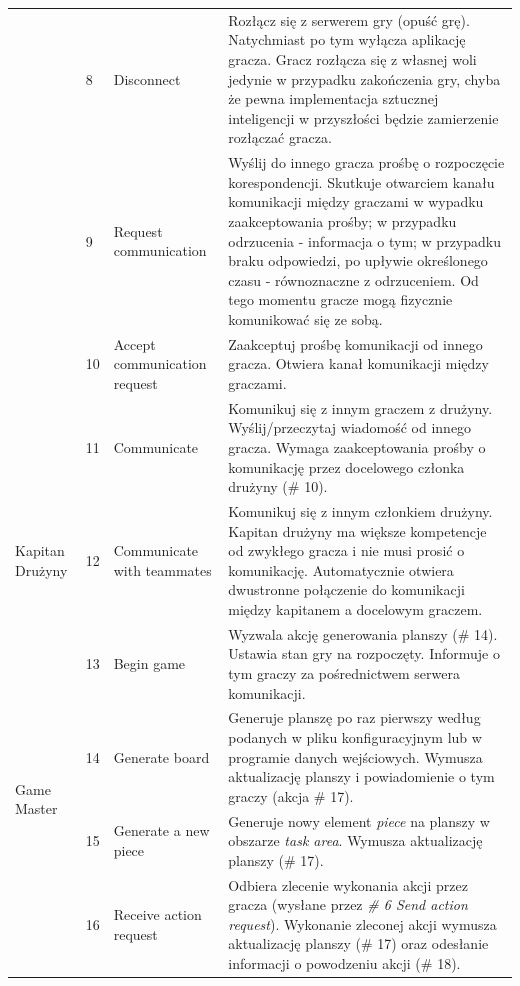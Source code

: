\documentclass[11pt]{article}
\begin{document}
\begin{longtable}{|p{}|p{}|p{}|p{}|}
\\ \cline{2-4}
& 8 
& Disconnect 
& Rozłącz się z serwerem gry (opuść grę). Natychmiast po tym wyłącza aplikację gracza. Gracz rozłącza się z własnej woli jedynie w przypadku zakończenia gry, chyba że pewna implementacja sztucznej inteligencji w przyszłości będzie zamierzenie rozłączać gracza.
\\ \cline{2-4}
& 9 
& Request communication 
& Wyślij do innego gracza prośbę o rozpoczęcie korespondencji. Skutkuje otwarciem kanału komunikacji między graczami w wypadku zaakceptowania prośby; w przypadku odrzucenia - informacja o tym; w przypadku braku odpowiedzi, po upływie określonego czasu - równoznaczne z odrzuceniem. Od tego momentu gracze mogą fizycznie komunikować się ze sobą.
\\ \cline{2-4}
& 10 
& Accept communication request 
& Zaakceptuj prośbę komunikacji od innego gracza. Otwiera kanał komunikacji między graczami.
\\ \cline{2-4}
& 11 
& Communicate 
& Komunikuj się z innym graczem z drużyny. Wyślij/przeczytaj wiadomość od innego gracza. Wymaga zaakceptowania prośby o komunikację przez docelowego członka drużyny (\# 10).
\\ \hline
Kapitan Drużyny 
& 12 
& Communicate with teammates 
& Komunikuj się z innym członkiem drużyny. Kapitan drużyny ma większe kompetencje od zwykłego gracza i nie musi prosić o komunikację. Automatycznie otwiera dwustronne połączenie do komunikacji między kapitanem a docelowym graczem. 
\\ \hline
\multirow{6}{.20\textwidth}{Game Master}
& 13
& Begin game
& Wyzwala akcję generowania planszy (\# 14). Ustawia stan gry na rozpoczęty. Informuje o tym graczy za pośrednictwem serwera komunikacji. 
\\ \cline{2-4}
& 14
& Generate board
& Generuje planszę po raz pierwszy według podanych w pliku konfiguracyjnym lub w programie danych wejściowych. Wymusza aktualizację planszy i powiadomienie o tym graczy (akcja \# 17).
\\ \cline{2-4}
& 15
& Generate a new piece
& Generuje nowy element \textit{piece} na planszy w obszarze \textit{task area}. Wymusza aktualizację planszy (\# 17).
\\ \cline{2-4}
& 16
& Receive action request
& Odbiera zlecenie wykonania akcji przez gracza (wysłane przez \textit{\# 6 Send action request}). Wykonanie zleconej akcji wymusza aktualizację planszy (\# 17) oraz odesłanie informacji o powodzeniu akcji (\# 18).
\\ \cline{2-4}

\end{longtable}
\end{document}

